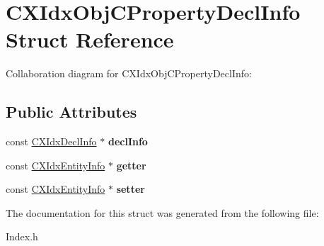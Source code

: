 \hypertarget{structCXIdxObjCPropertyDeclInfo}{}\section{C\+X\+Idx\+Obj\+C\+Property\+Decl\+Info Struct Reference}
\label{structCXIdxObjCPropertyDeclInfo}


Collaboration diagram for C\+X\+Idx\+Obj\+C\+Property\+Decl\+Info\+:
\subsection*{Public Attributes}
\begin{DoxyCompactItemize}
\item 
\mbox{\label{structCXIdxObjCPropertyDeclInfo_a702a37ed4078ebabcb9e56822f4dcc10}} 
const \hyperlink{structCXIdxDeclInfo}{C\+X\+Idx\+Decl\+Info} $\ast$ {\bfseries decl\+Info}
\item 
\mbox{\label{structCXIdxObjCPropertyDeclInfo_a4e750cdf4e99925701977b690a75e836}} 
const \hyperlink{structCXIdxEntityInfo}{C\+X\+Idx\+Entity\+Info} $\ast$ {\bfseries getter}
\item 
\mbox{\label{structCXIdxObjCPropertyDeclInfo_a3ac3b902f120afae9b10691b4ca15fe5}} 
const \hyperlink{structCXIdxEntityInfo}{C\+X\+Idx\+Entity\+Info} $\ast$ {\bfseries setter}
\end{DoxyCompactItemize}


The documentation for this struct was generated from the following file\+:\begin{DoxyCompactItemize}
\item 
Index.\+h\end{DoxyCompactItemize}
